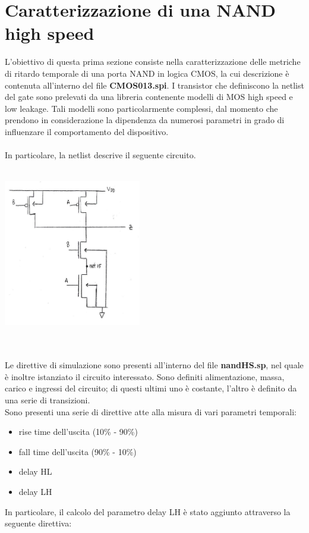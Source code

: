\documentclass[11pt,  english, makeidx, a4paper, titlepage, oneside]{book}
\begin{document}
\section{Caratterizzazione di una NAND high speed}
L'obiettivo di questa prima sezione consiste nella caratterizzazione delle metriche di ritardo temporale di una porta NAND in logica CMOS, la cui descrizione è contenuta all'interno del file \textbf{CMOS013.spi}.
I transistor che definiscono la netlist del gate sono prelevati da una libreria contenente modelli di MOS high speed e low leakage. Tali modelli sono particolarmente complessi, dal momento che prendono in considerazione la dipendenza da numerosi parametri in grado di influenzare il comportamento del dispositivo.
\\\\
In particolare, la netlist descrive il seguente circuito.
\\\\
\centerline{\includegraphics[width=6cm]{./img/Lab_5/nand_netlist.jpg}}
\\\\
Le direttive di simulazione sono presenti all'interno del file \textbf{nandHS.sp}, nel quale è inoltre istanziato il circuito interessato. Sono definiti alimentazione, massa, carico e ingressi del circuito; di questi ultimi uno è costante, l'altro è definito da una serie di transizioni.
\\
Sono presenti una serie di direttive atte alla misura di vari parametri temporali:
\begin{itemize}
\item rise time dell'uscita (10\% - 90\%)
\item fall time dell'uscita (90\% - 10\%)
\item delay HL
\item delay LH
\end{itemize}
In particolare, il calcolo del parametro delay LH è stato aggiunto attraverso la seguente direttiva:
\end{document}
